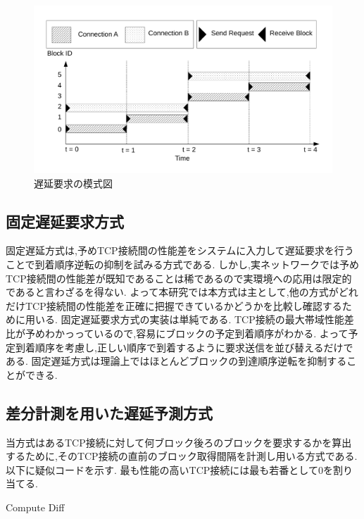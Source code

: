 \documentclass[a4j,12pt]{gradthesis_utf8}
\begin{document}
\begin{figure}[ht]
    \centering
    \includegraphics[width=16.25cm]{figure/delay.pdf}
    \caption{遅延要求の模式図}
    \label{delay}
\end{figure}

\subsection{固定遅延要求方式}
\label{kotei}
固定遅延方式は,予めTCP接続間の性能差をシステムに入力して遅延要求を行うことで到着順序逆転の抑制を試みる方式である.
しかし,実ネットワークでは予めTCP接続間の性能差が既知であることは稀であるので実環境への応用は限定的であると言わざるを得ない.
よって本研究では本方式は主として,他の方式がどれだけTCP接続間の性能差を正確に把握できているかどうかを比較し確認するために用いる.
固定遅延要求方式の実装は単純である.
TCP接続の最大帯域性能差比が予めわかっっているので,容易にブロックの予定到着順序がわかる.
よって予定到着順序を考慮し,正しい順序で到着するように要求送信を並び替えるだけである.
固定遅延方式は理論上ではほとんどブロックの到達順序逆転を抑制することができる.

\subsection{差分計測を用いた遅延予測方式}
\label{diff}
当方式はあるTCP接続に対して何ブロック後ろのブロックを要求するかを算出するために,そのTCP接続の直前のブロック取得間隔を計測し用いる方式である.
以下に疑似コードを示す.
最も性能の高いTCP接続には最も若番として0を割り当てる.

\begin{algorithm}
	\caption{Compute Diff}
	\begin{algorithmic}[1]
		\Else 
		\EndIf
	\end{algorithmic}
\end{algorithm}
\end{document}
